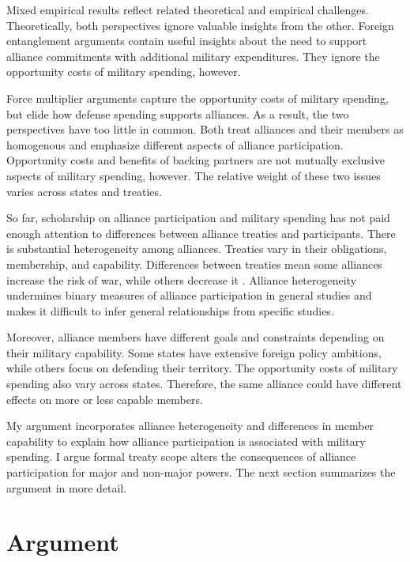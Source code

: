 \documentclass[12pt]{article}
\begin{document}
Mixed empirical results reflect related theoretical and empirical challenges. 
Theoretically, both perspectives ignore valuable insights from the other.  
Foreign entanglement arguments contain useful insights about the need to support alliance commitments with additional military expenditures.
They ignore the opportunity costs of military spending, however. 


Force multiplier arguments capture the opportunity costs of military spending, but elide how defense spending supports alliances. 
As a result, the two perspectives have too little in common. 
Both treat alliances and their members as homogenous and emphasize different aspects of alliance participation. 
Opportunity costs and benefits of backing partners are not mutually exclusive aspects of military spending, however. 
The relative weight of these two issues varies across states and treaties. 


So far, scholarship on alliance participation and military spending has not paid enough attention to differences between alliance treaties and participants.
There is substantial heterogeneity among alliances.
Treaties vary in their obligations, membership, and capability. 
Differences between treaties mean some alliances increase the risk of war, while others decrease it \citep{Leeds2003, Benson2012}. 
Alliance heterogeneity undermines binary measures of alliance participation in general studies and makes it difficult to infer general relationships from specific studies. 
 

Moreover, alliance members have different goals and constraints depending on their military capability.
Some states have extensive foreign policy ambitions, while others focus on defending their territory. 
The opportunity costs of military spending also vary across states. 
Therefore, the same alliance could have different effects on more or less capable members. 


My argument incorporates alliance heterogeneity and differences in member capability to explain how alliance participation is associated with military spending. 
I argue formal treaty scope alters the consequences of alliance participation for major and non-major powers. 
The next section summarizes the argument in more detail. 



\section{Argument}
\end{document}
